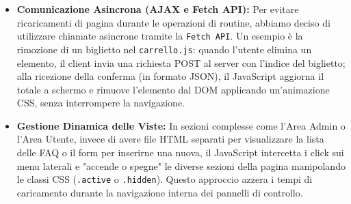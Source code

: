 \documentclass[11pt,a4paper]{article}
\begin{document}
\begin{itemize}
    \item \textbf{Comunicazione Asincrona (AJAX e Fetch API):}
    Per evitare ricaricamenti di pagina durante le operazioni di routine, abbiamo deciso di utilizzare chiamate asincrone tramite la \texttt{Fetch API}. Un esempio è la rimozione di un biglietto nel \texttt{carrello.js}: quando l'utente elimina un elemento, il client invia una richiesta POST al server con l'indice del biglietto; alla ricezione della conferma (in formato JSON), il JavaScript aggiorna il totale a schermo e rimuove l'elemento dal DOM applicando un'animazione CSS, senza interrompere la navigazione.
    
    \item \textbf{Gestione Dinamica delle Viste:}
    In sezioni complesse come l'Area Admin o l'Area Utente, invece di avere file HTML separati per visualizzare la lista delle FAQ o il form per inserirne una nuova, il JavaScript intercetta i click sui menu laterali e "accende o spegne" le diverse sezioni della pagina manipolando le classi CSS (\texttt{.active} o \texttt{.hidden}). Questo approccio azzera i tempi di caricamento durante la navigazione interna dei pannelli di controllo.
    

\end{itemize}
\end{document}
